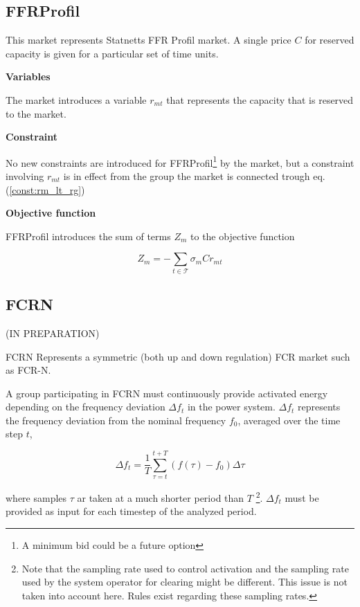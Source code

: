 \documentclass[]{report}
\newcommand{\timesteps}{\mathcal{T}}
\newcommand{\sign}{\sigma}
\begin{document}
\subsection{FFRProfil}
This market represents Statnetts FFR Profil market. A single price $C$ for reserved capacity is given for a particular set of time units.

\textbf{Variables}

The market introduces a variable $r_{mt}$ that represents the capacity that is reserved to the market.

\textbf{Constraint}

No new constraints are introduced for FFRProfil\footnote{A minimum bid could be a future option} by the market, but a constraint involving $r_{mt}$ is in effect from the group the market is connected trough eq. (\ref{const:rm_lt_rg})

\textbf{Objective function}

FFRProfil introduces the sum of terms $Z_m$ to the objective function

\begin{equation}
    Z_m = -\sum_{t \in \timesteps} \sign_m Cr_{mt} 
\end{equation}

\subsection{FCRN}
(IN PREPARATION)

FCRN Represents a symmetric (both up and down regulation) FCR market such as FCR-N.

A group participating in FCRN must continuously provide activated energy depending on the frequency deviation $\Delta f_t$ in the power system. $\Delta f_t$ represents the frequency deviation from the nominal frequency $f_0$, averaged over the time step $t$, 

\begin{equation}
    \Delta f_t = \frac{1}{T}\sum_{\tau = t}^{t+T} (f(\tau)-f_0) \Delta{\tau}
\end{equation}

where samples $\tau$ ar taken at a much shorter period than $T$
\footnote{Note that the sampling rate used to control activation and the sampling rate used by the system operator for clearing might be different. This issue is not taken into account here. Rules exist regarding these sampling rates.}. $\Delta f_t$ must be provided as input for each timestep of the analyzed period.
\end{document}
